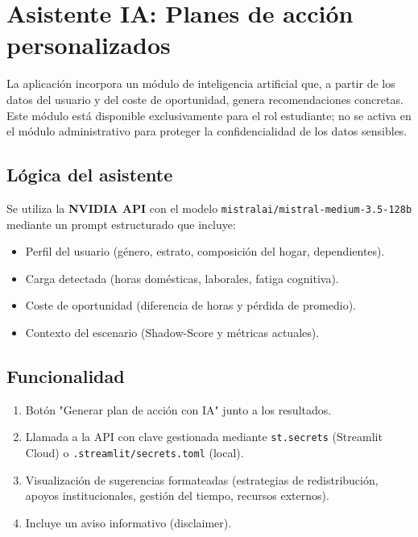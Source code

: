 \documentclass[12pt, spanish]{article}
\begin{document}
\section{Asistente IA: Planes de acción personalizados}

La aplicación incorpora un módulo de inteligencia artificial que, a partir de los datos del usuario y del coste de oportunidad, genera recomendaciones concretas. Este módulo está disponible exclusivamente para el rol estudiante; no se activa en el módulo administrativo para proteger la confidencialidad de los datos sensibles.

\subsection{Lógica del asistente}
Se utiliza la \textbf{NVIDIA API} con el modelo \texttt{mistralai/mistral-medium-3.5-128b} mediante un prompt estructurado que incluye:
\begin{itemize}
    \item Perfil del usuario (género, estrato, composición del hogar, dependientes).
    \item Carga detectada (horas domésticas, laborales, fatiga cognitiva).
    \item Coste de oportunidad (diferencia de horas y pérdida de promedio).
    \item Contexto del escenario (Shadow-Score y métricas actuales).
\end{itemize}

\subsection{Funcionalidad}
\begin{enumerate}
    \item Botón "Generar plan de acción con IA" junto a los resultados.
    \item Llamada a la API con clave gestionada mediante \texttt{st.secrets} (Streamlit Cloud) o \texttt{.streamlit/secrets.toml} (local).
    \item Visualización de sugerencias formateadas (estrategias de redistribución, apoyos institucionales, gestión del tiempo, recursos externos).
    \item Incluye un aviso informativo (disclaimer).
\end{enumerate}
\end{document}
